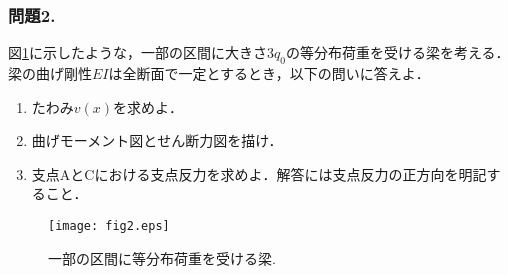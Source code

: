 \documentclass[10pt,a4j]{jarticle}
\begin{document}
\subsubsection*{問題2. }
図\ref{fig:fig2}に示したような，一部の区間に大きさ$3q_0$の等分布荷重を受ける梁を考える．
梁の曲げ剛性$EI$は全断面で一定とするとき，以下の問いに答えよ．
\begin{enumerate}
\item
	たわみ$v(x)$を求めよ．		
\item
	曲げモーメント図とせん断力図を描け．
\item
	支点AとCにおける支点反力を求めよ．解答には支点反力の正方向を明記すること．
\end{enumerate}
\begin{figure}[h]
	\begin{center}
	\texttt{[image: fig2.eps]} 
	\end{center}
	\vspace{-5mm}
	\caption{一部の区間に等分布荷重を受ける梁.}
	\label{fig:fig2}
\end{figure}
\end{document}
